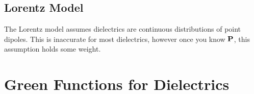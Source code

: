 \documentclass[12pt]{article}
\theoremstyle{plain}
\theoremstyle{definition}
\begin{document}
\subsection{Lorentz Model}
The Lorentz model assumes dielectrics are continuous distributions of point dipoles. This is inaccurate for most dielectrics, however once you know $\vb{P}$, this assumption holds some weight. 

\section{Green Functions for Dielectrics}
\end{document}
